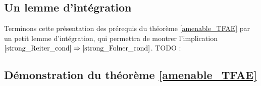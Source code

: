 \documentclass[a4paper,12pt]{article}
\newcommand{\ev}{\mathrm{ev}}
\newcommand{\norm}[1]{\left\Vert #1\right\Vert}
\newcommand{\abs}[1]{\left\vert#1\right\vert}
\newcommand{\set}[1]{\left\{ #1 \right\}}
\newcommand\fundef[3]{#1: \left\{\begin{array}{ccc}#2\\#3\end{array}\right.}
\newcommand{\tq}{\;\middle|\;}
\newcommand{\ssi}{si et seulement si }
\newcommand{\inv}{^{-1}}
\newcommand{\comp}{\circ}
\newcommand{\nhds}{\mathcal{N}}
\renewcommand{\implies}{\Rightarrow}
\renewcommand{\iff}{\Leftrightarrow}
\newcommand{\TODO}[1]{{\color{red}TODO :} #1}
\begin{document}

\subsection{Un lemme d'intégration}

Terminons cette présentation des prérequis du théorème \ref{amenable_TFAE} par un petit lemme d'intégration,
qui permettra de montrer l'implication $\eqref{strong_Reiter_cond}\implies\eqref{strong_Folner_cond}$. \TODO{}

\subsection{Démonstration du théorème \ref{amenable_TFAE}} 
\end{document}
